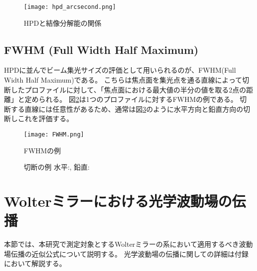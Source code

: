 \begin{figure}[ht]
\centering
\texttt{[image: hpd\_arcsecond.png]}
\caption{HPDと結像分解能の関係}
\label{fig:hpd_arcsecond}
\end{figure}


\subsection{FWHM (Full Width Half Maximum)}
\label{chap2_fwhm}

HPDに並んでビーム集光サイズの評価として用いられるのが、FWHM(Full Width Half Maximum)である。
こちらは焦点面を集光点を通る直線によって切断したプロファイルに対して、「焦点面における最大値の半分の値を取る2点の距離」と定められる。
図\ref{fig:fwhm_explanation_profile}は1つのプロファイルに対するFWHMの例である。
切断する直線には任意性があるため、通常は図\ref{fig:fwhm_explanation}のように水平方向と鉛直方向の切断しこれを評価する。

\begin{figure}[ht]
\centering
\texttt{[image: FWHM.png]}
\caption{FWHMの例}
\label{fig:fwhm_explanation_profile}
\end{figure}

\begin{figure}[!ht]
\centering

\caption[]{切断の例 水平:, 鉛直:}
\label{fig:fwhm_explanation}
\end{figure}


\clearpage
\newpage

\section{Wolterミラーにおける光学波動場の伝播}
本節では、本研究で測定対象とするWolterミラーの系において適用するべき波動場伝播の近似公式について説明する。
光学波動場の伝播に関しての詳細は付録において解説する。

\clearpage
\newpage


